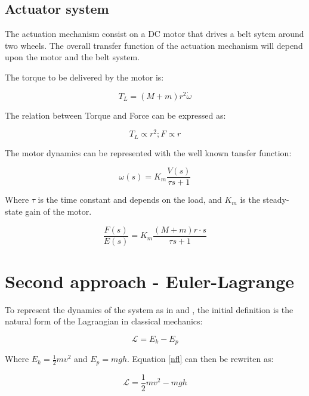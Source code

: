 \subsection{Actuator system}

The actuation mechanism consist on a DC motor that drives a belt sytem around two wheels. The overall transfer function of the actuation mechanism will depend upon the motor and the belt system.

The torque to be delivered by the motor is:

\begin{equation} \label{t}
	T_L=(M+m)r^2\dot{\omega}
\end{equation}

The relation between Torque and Force can be expressed as:

\begin{equation} \label{dtf}
	T_L\propto r^2 ; F\propto r
\end{equation}

The motor dynamics can be represented with the well known tansfer function:

\begin{equation} \label{md}
	\omega(s)=K_m\frac{V(s)}{\tau s+1}
\end{equation}

Where $\tau$ is the time constant and depends on the load, and $K_m$ is the steady-state gain of the motor.

\begin{equation} \label{mtf}
	\frac{F(s)}{E(s)}=K_m\frac{(M+m)r\cdot s}{\tau s+1}
\end{equation}

\section{Second approach - Euler-Lagrange}

To represent the dynamics of the system as in \cite{JER12} and \cite{LUN02}, the initial definition is the natural form of the Lagrangian in classical mechanics:

\begin{equation} \label{nfl}
	\mathcal{L}=E_k-E_p
\end{equation}

Where $E_k=\frac{1}{2}mv^2$ and $E_p=mgh$. Equation \ref{nfl} can then be rewriten as:

\begin{equation} \label{nflr}
	\mathcal{L}=\frac{1}{2}mv^2-mgh
\end{equation}

